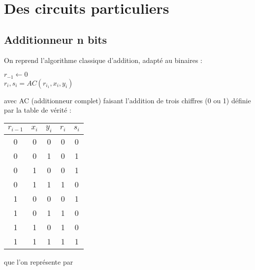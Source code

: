 \section{Des circuits particuliers}

\subsection{Additionneur n bits}

\begin{algo}
	On reprend l'algorithme classique d'addition, adapté au binaires :\\
	\begin{algorithm}[H]
		\caption{$Addition(x, y)$}
		$r_{-1} \gets 0$\\
		{
			$r_i, s_i = AC(r_{i_1}, x_i, y_i)$
		}
	\end{algorithm}
	avec AC (additionneur complet) faisant l'addition de trois chiffres (0 ou 1) définie par la table de vérité :\\
	\begin{tabular}{|c|c|c||c|c|}
		\hline
		$r_{i-1}$ & $x_i$ & $y_i$ & $r_i$ & $s_i$  \\ \hline
		0 & 0 & 0 & 0 & 0 \\ \hline
		0 & 0 & 1 & 0 & 1 \\ \hline
		0 & 1 & 0 & 0 & 1 \\ \hline
		0 & 1 & 1 & 1 & 0 \\ \hline
		1 & 0 & 0 & 0 & 1 \\ \hline
		1 & 0 & 1 & 1 & 0 \\ \hline
		1 & 1 & 0 & 1 & 0 \\ \hline
		1 & 1 & 1 & 1 & 1\\ \hline
	\end{tabular} \quad que l'on représente par \qquad {}
\end{algo}

